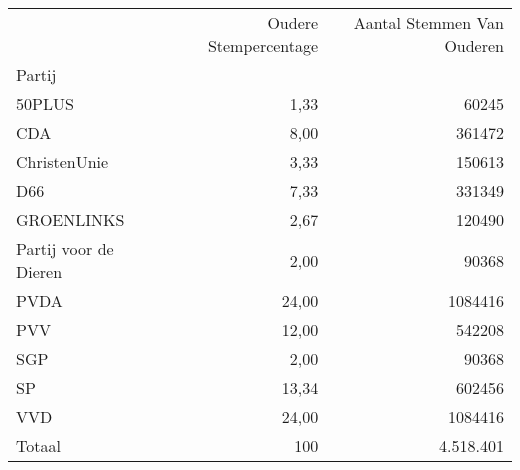 \begin{tabular}{lrr}
\toprule
{} &  Oudere Stempercentage &  Aantal Stemmen Van Ouderen \\
Partij                &                        &                             \\
\midrule
50PLUS                &                   1,33 &                       60245 \\
CDA                   &                   8,00 &                      361472 \\
ChristenUnie          &                   3,33 &                      150613 \\
D66                   &                   7,33 &                      331349 \\
GROENLINKS            &                   2,67 &                      120490 \\
Partij voor de Dieren &                   2,00 &                       90368 \\
PVDA                  &                  24,00 &                     1084416 \\
PVV                   &                  12,00 &                      542208 \\
SGP                   &                   2,00 &                       90368 \\
SP                    &                  13,34 &                      602456 \\
VVD                   &                  24,00 &                     1084416 \\
\midrule
Totaal				&				100		&						4.518.401\\
\bottomrule
\end{tabular}
